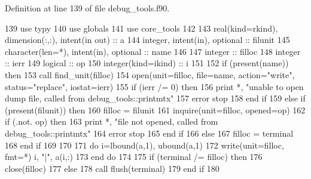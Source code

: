 Definition at line 139 of file debug\+\_\+tools.\+f90.


\begin{DoxyCode}
139       \textcolor{keywordtype}{use }typy
140       \textcolor{keywordtype}{use }globals
141       \textcolor{keywordtype}{use }core_tools
142 
143       \textcolor{keywordtype}{real(kind=rkind)}, \textcolor{keywordtype}{dimension(:,:)}, \textcolor{keywordtype}{intent(in out)} :: a
144       \textcolor{keywordtype}{integer}, \textcolor{keywordtype}{intent(in)}, \textcolor{keywordtype}{optional} :: filunit     
145       \textcolor{keywordtype}{character(len=*)}, \textcolor{keywordtype}{intent(in)}, \textcolor{keywordtype}{optional} :: name
146 
147       \textcolor{keywordtype}{integer} :: filloc
148       \textcolor{keywordtype}{integer} :: ierr
149       \textcolor{keywordtype}{logical} :: op
150       \textcolor{keywordtype}{integer(kind=ikind)} :: i
151       
152       \textcolor{keywordflow}{if} (\textcolor{keyword}{present}(name)) \textcolor{keywordflow}{then}
153         \textcolor{keyword}{call }find_unit(filloc)
154         \textcolor{keyword}{open}(unit=filloc, file=name, action=\textcolor{stringliteral}{"write"}, status=\textcolor{stringliteral}{"replace"}, iostat\textcolor{comment}{=ierr)}
155 \textcolor{comment}{        }\textcolor{keywordflow}{if} (ierr /= 0) \textcolor{keywordflow}{then}
156           print *, \textcolor{stringliteral}{"unable to open dump file, called from debug\_tools::printmtx"}
157           error stop
158 \textcolor{keywordflow}{        end if}
159       \textcolor{keywordflow}{else} \textcolor{keywordflow}{if} (\textcolor{keyword}{present}(filunit)) \textcolor{keywordflow}{then}
160         filloc = filunit
161         \textcolor{keyword}{inquire}(unit=filloc, opened=op)
162         \textcolor{keywordflow}{if} (.not. op) \textcolor{keywordflow}{then}
163           print *, \textcolor{stringliteral}{"file not opened, called from debug\_tools::printmtx"}
164           error stop
165 \textcolor{keywordflow}{        end if}
166       \textcolor{keywordflow}{else}
167         filloc = terminal
168 \textcolor{keywordflow}{      end if}
169       
170       
171       \textcolor{keywordflow}{do} i=lbound(a,1), ubound(a,1)
172         \textcolor{keyword}{write}(unit=filloc, fmt=*)  i, \textcolor{stringliteral}{"|"},  a(i,:)
173 \textcolor{keywordflow}{      end do}
174 
175       \textcolor{keywordflow}{if} (terminal /= filloc) \textcolor{keywordflow}{then}
176         \textcolor{keyword}{close}(filloc)
177       \textcolor{keywordflow}{else}
178         \textcolor{keyword}{call }flush(terminal)
179 \textcolor{keywordflow}{      end if}
180       
\end{DoxyCode}
